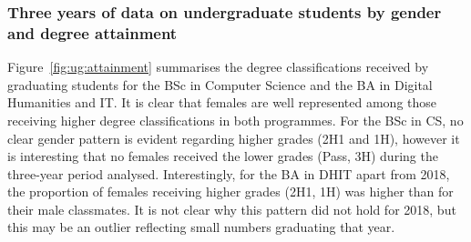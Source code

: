 



\subsubsection{Three years of data on undergraduate students by gender and 
degree attainment}


Figure~\ref{fig:ug:attainment} summarises the degree classifications received  
by graduating students for the BSc in Computer Science and the BA in Digital 
Humanities and IT.  It is clear that females are well represented among those  
receiving higher degree classifications in both programmes. For the BSc in CS,
no clear gender pattern is evident regarding higher grades (2H1 and 1H), however
it is interesting that no females received the lower grades (Pass, 3H) during
the three-year period analysed. Interestingly, for the BA in DHIT apart
from 2018, the proportion of females receiving higher grades (2H1, 1H) was
higher than for their male classmates. It is not clear why this pattern
did not hold for 2018, but this may be an outlier reflecting small numbers
graduating that year.

